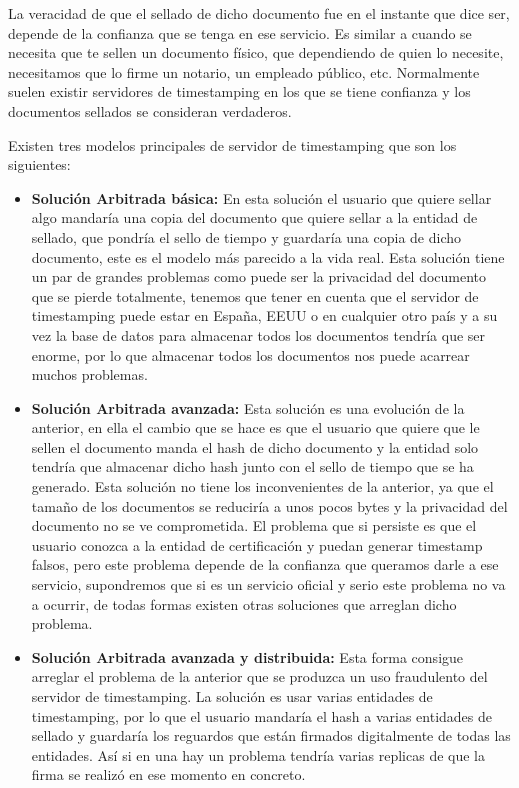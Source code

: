 La veracidad de que el sellado de dicho documento fue en el instante que dice ser, depende de la confianza que se tenga en ese servicio. Es similar a cuando se necesita que te sellen un documento físico, que dependiendo de quien lo necesite, necesitamos que lo firme un notario, un empleado público, etc. Normalmente suelen existir servidores de timestamping en los que se tiene confianza y los documentos sellados se consideran verdaderos.

Existen tres modelos principales de servidor de timestamping que son los siguientes:

\begin{itemize}

\item \textbf{Solución Arbitrada básica:} En esta solución el usuario que quiere sellar algo mandaría una copia del documento que quiere sellar a la entidad de sellado, que pondría el sello de tiempo y guardaría una copia de dicho documento, este es el modelo más parecido a la vida real. Esta solución tiene un par de grandes problemas como puede ser la privacidad del documento que se pierde totalmente, tenemos que tener en cuenta que el servidor de timestamping puede estar en España, EEUU o en cualquier otro país y a su vez la base de datos para almacenar todos los documentos tendría que ser enorme, por lo que almacenar todos los documentos nos puede acarrear muchos problemas.

\item \textbf{Solución Arbitrada avanzada:} Esta solución es una evolución de la anterior, en ella el cambio que se hace es que el usuario que quiere que le sellen el documento manda el hash de dicho documento y la entidad solo tendría que almacenar dicho hash junto con el sello de tiempo que se ha generado. Esta solución no tiene los inconvenientes de la anterior, ya que el tamaño de los documentos se reduciría a unos pocos bytes y la privacidad del documento no se ve comprometida. El problema que si persiste es que el usuario conozca a la entidad de certificación y puedan generar timestamp falsos, pero este problema depende de la confianza que queramos darle a ese servicio, supondremos que si es un servicio oficial y serio este problema no va a ocurrir, de todas formas existen otras soluciones que arreglan dicho problema.

\item \textbf{Solución Arbitrada avanzada y distribuida:} Esta forma consigue arreglar el problema de la anterior que se produzca un uso fraudulento del servidor de timestamping. La solución es usar varias entidades de timestamping, por lo que el usuario mandaría el hash a varias entidades de sellado y guardaría los reguardos que están firmados digitalmente de todas las entidades. Así si en una hay un problema tendría varias replicas de que la firma se realizó en ese momento en concreto.


\end{itemize}
